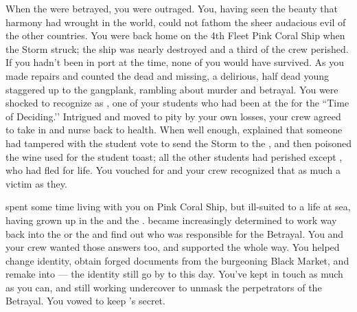 \documentclass[char]{GL2020}
\begin{document}
When the \pShip{} were betrayed, you were outraged. You, having seen the beauty that harmony had wrought in the world, could not fathom the sheer audacious evil of the other countries. You were back home on the 4th Fleet Pink Coral Ship when the Storm struck; the ship was nearly destroyed and a third of the crew perished. If you hadn't been in port at the time, none of you would have survived. As you made repairs and counted the dead and missing, a delirious, half dead young \cKidScientist{\person} staggered up to the gangplank, rambling about murder and betrayal. You were shocked to recognize \cKidScientist{\them} as \cKidScientist{\full}, one of your students who had been at the \pSchool{} for the ``Time of Deciding.’’ Intrigued and moved to pity by your own losses, your crew agreed to take \cKidScientist{\them} in and nurse \cKidScientist{\them} back to health. When \cKidScientist{\theywere} well enough, \cKidScientist{} explained that someone had tampered with the student vote to send the Storm to the \pShip{}, and then poisoned the wine used for the student toast; all the other students had perished except \cKidScientist{}, who had fled for \cKidScientist{\their} life. You vouched for \cKidScientist{\them} and your crew recognized that \cKidScientist{\theywere} as much a victim as they. 

\cKidScientist{} spent some time living with you on Pink Coral Ship, but \cKidScientist{\theywere} ill-suited to a life at sea, having grown up in the \pTech{} and the \pFarm{}. \cKidScientist{\They} became increasingly determined to work \cKidScientist{\their} way back into the \pFarm{} or the \pTech{} and find out who was responsible for the Betrayal. You and your crew wanted those answers too, and supported \cKidScientist{\them} the whole way. You helped \cKidScientist{\them} change \cKidScientist{\their} identity, obtain forged documents from the burgeoning Black Market, and remake \cKidScientist{\them} into \cAssistantScientist{\full} — the identity \cKidScientist{\they} still go\cKidScientist{\verbes} by to this day. You’ve kept in touch as much as you can, and \cKidScientist{\theyare} still working undercover to unmask the perpetrators of the Betrayal. You vowed to keep \cKidScientist{}’s secret.
\end{document}
